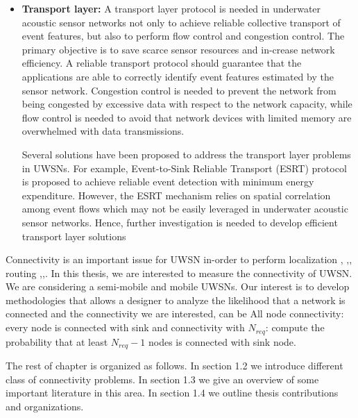 \documentclass[12pt]{article}
\begin{document}
\begin{itemize}
\item \textbf{Transport layer: }
A transport layer protocol is needed in underwater acoustic sensor networks not
only to achieve reliable collective transport of event features, but also to perform
flow control and congestion control. The primary objective is to save scarce
sensor resources and in-crease network efficiency. A reliable transport protocol
should guarantee that the applications are able to correctly identify event
features estimated by the sensor network. Congestion control is needed to
prevent the network from being congested by excessive data with respect to the
network capacity, while flow control is needed to avoid that network devices
with limited memory are overwhelmed with data transmissions.


Several solutions have been proposed to address the transport layer problems
in UWSNs. For example, Event-to-Sink Reliable Transport (ESRT) protocol is proposed to achieve reliable event detection with minimum energy expenditure. However, the ESRT mechanism relies on spatial
correlation among event flows which may not be easily leveraged in underwater
acoustic sensor networks. Hence, further investigation is needed to develop
efficient transport layer solutions
\end{itemize}
 

 Connectivity is an important issue for UWSN in-order to perform localization \cite{zhou2010efficient}, \cite{zhou2011scalable},\cite{erol2011performance}, routing \cite{noh2013vapr},\cite{ying2011combining},\cite{lee2010pressure}. In this thesis, we are interested to measure the connectivity of UWSN. We are considering a  semi-mobile and mobile UWSNs. Our interest is to develop methodologies that allows a designer to analyze the likelihood  that a network is connected and the connectivity we are interested, can be All node connectivity: every node is connected with sink and connectivity with $N_{req}$: compute the probability that at least $N_{req}-1$ nodes is connected with sink node.
 
 
 The rest of chapter is organized as follows. In section 1.2 we introduce different class of connectivity  problems. In section 1.3 we give an overview of some
important literature in this area. In section 1.4 we outline thesis
contributions and organizations.
\end{document}
